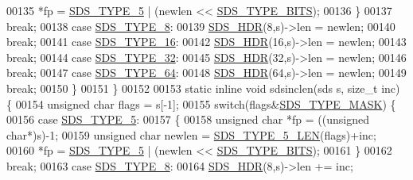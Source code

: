 \begin{DoxyCode}
00135                 *fp = \hyperlink{sds_8h_a3b7b67f1efa75f6b78ae18ea853b1a91}{SDS\_TYPE\_5} | (newlen << \hyperlink{sds_8h_aab3be62faa5a2354242a1c1036450a40}{SDS\_TYPE\_BITS});
00136             \}
00137             \textcolor{keywordflow}{break};
00138         \textcolor{keywordflow}{case} \hyperlink{sds_8h_a504136356f04bfa2fd616dd4c8fdd71c}{SDS\_TYPE\_8}:
00139             \hyperlink{sds_8h_a0f1b0d97d094e8505c1d46f95c6cbc30}{SDS\_HDR}(8,s)->len = newlen;
00140             \textcolor{keywordflow}{break};
00141         \textcolor{keywordflow}{case} \hyperlink{sds_8h_aa54044bf70a30824caeb1bab3615bff2}{SDS\_TYPE\_16}:
00142             \hyperlink{sds_8h_a0f1b0d97d094e8505c1d46f95c6cbc30}{SDS\_HDR}(16,s)->len = newlen;
00143             \textcolor{keywordflow}{break};
00144         \textcolor{keywordflow}{case} \hyperlink{sds_8h_a0ad2103bbdaa2fe5511ce3279cb42293}{SDS\_TYPE\_32}:
00145             \hyperlink{sds_8h_a0f1b0d97d094e8505c1d46f95c6cbc30}{SDS\_HDR}(32,s)->len = newlen;
00146             \textcolor{keywordflow}{break};
00147         \textcolor{keywordflow}{case} \hyperlink{sds_8h_ad03c6e0fdab3a871e10cce347e8bb4e6}{SDS\_TYPE\_64}:
00148             \hyperlink{sds_8h_a0f1b0d97d094e8505c1d46f95c6cbc30}{SDS\_HDR}(64,s)->len = newlen;
00149             \textcolor{keywordflow}{break};
00150     \}
00151 \}
00152 
00153 \textcolor{keyword}{static} \textcolor{keyword}{inline} \textcolor{keywordtype}{void} sdsinclen(sds s, size\_t inc) \{
00154     \textcolor{keywordtype}{unsigned} \textcolor{keywordtype}{char} flags = s[-1];
00155     \textcolor{keywordflow}{switch}(flags&\hyperlink{sds_8h_a07564783f389fdd7772a8f61d55d9ddf}{SDS\_TYPE\_MASK}) \{
00156         \textcolor{keywordflow}{case} \hyperlink{sds_8h_a3b7b67f1efa75f6b78ae18ea853b1a91}{SDS\_TYPE\_5}:
00157             \{
00158                 \textcolor{keywordtype}{unsigned} \textcolor{keywordtype}{char} *fp = ((\textcolor{keywordtype}{unsigned} \textcolor{keywordtype}{char}*)s)-1;
00159                 \textcolor{keywordtype}{unsigned} \textcolor{keywordtype}{char} newlen = \hyperlink{sds_8h_a387aebc42becc7d798cd1a33533da2de}{SDS\_TYPE\_5\_LEN}(flags)+inc;
00160                 *fp = \hyperlink{sds_8h_a3b7b67f1efa75f6b78ae18ea853b1a91}{SDS\_TYPE\_5} | (newlen << \hyperlink{sds_8h_aab3be62faa5a2354242a1c1036450a40}{SDS\_TYPE\_BITS});
00161             \}
00162             \textcolor{keywordflow}{break};
00163         \textcolor{keywordflow}{case} \hyperlink{sds_8h_a504136356f04bfa2fd616dd4c8fdd71c}{SDS\_TYPE\_8}:
00164             \hyperlink{sds_8h_a0f1b0d97d094e8505c1d46f95c6cbc30}{SDS\_HDR}(8,s)->len += inc;

\end{DoxyCode}
